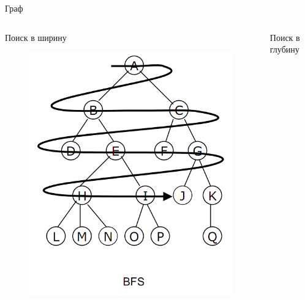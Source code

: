 \documentclass[newPxFont]{beamer}
\begin{document}
\begin{frame}{Граф}
\begin{columns}
	\begin{column}{.4\linewidth}
		Поиск в ширину
		\begin{figure}
		\centerline{\includegraphics[width=1.0\linewidth]{images/bfs.png}}
		\end{figure}
	\end{column}
	\begin{column}{.4\linewidth}
		Поиск в глубину
		\begin{figure}

\end{figure}
\end{column}
\end{columns}
\end{frame}
\end{document}
